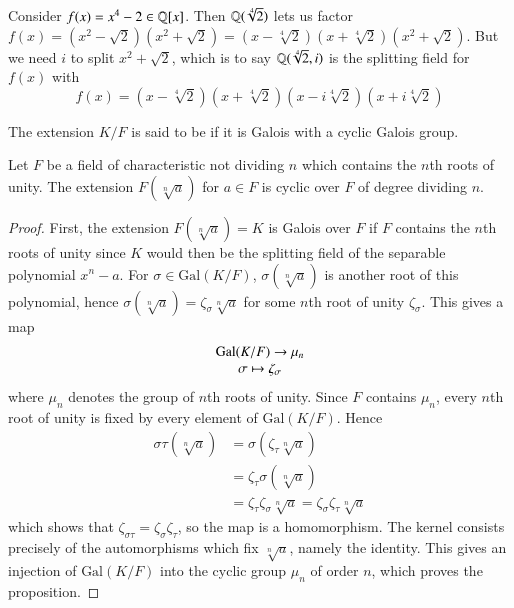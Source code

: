 \documentclass[12pt, a4paper, oneside, openright, titlepage]{book}
\begin{document}
\begin{eg}
    Consider $f(x) = x^4 - 2 \in \mathbb Q[x]$. Then $\mathbb Q(\sqrt[4]{2})$ lets us factor $f(x) = (x^2-\sqrt{2})(x^2+\sqrt{2}) = (x-\sqrt[4]{2})(x+\sqrt[4]{2})(x^2+\sqrt{2})$. But we need $i$ to split $x^2+\sqrt{2}$, which is to say $\mathbb Q(\sqrt[4]{2},i)$ is the splitting field for $f(x)$ with \begin{equation*}
        f(x) = (x-\sqrt[4]{2})(x+\sqrt[4]{2})(x-i\sqrt[4]{2})(x+i\sqrt[4]{2})
    \end{equation*}
\end{eg}

\begin{defn}
    The extension $K/F$ is said to be  if it is Galois with a cyclic Galois group.
\end{defn}


\begin{prop}
    Let $F$ be a field of characteristic not dividing $n$ which contains the $n$th roots of unity. The extension $F(\sqrt[n]{a})$ for $a \in F$ is cyclic over $F$ of degree dividing $n$.
\end{prop}
\begin{proof}
    First, the extension $F(\sqrt[n]{a}) = K$ is Galois over $F$ if $F$ contains the $n$th roots of unity since $K$ would then be the splitting field of the separable polynomial $x^n - a$. For $\sigma \in \text{Gal}(K/F)$, $\sigma(\sqrt[n]{a})$ is another root of this polynomial, hence $\sigma(\sqrt[n]{a}) = \zeta_{\sigma}\sqrt[n]{a}$ for some $n$th root of unity $\zeta_{\sigma}$. This gives a map \begin{equation*}
        \begin{array}{c} \text{Gal}(K/F)\rightarrow \mu_n \\ \sigma\mapsto \zeta_{\sigma} \end{array}
    \end{equation*}
    where $\mu_n$ denotes the group of $n$th roots of unity. Since $F$ contains $\mu_n$, every $n$th root of unity is fixed by every element of $\text{Gal}(K/F)$. Hence \begin{align*}
        \sigma\tau(\sqrt[n]{a}) &= \sigma(\zeta_{\tau}\sqrt[n]{a}) \\
        &= \zeta_{\tau}\sigma(\sqrt[n]{a}) \\
        &= \zeta_{\tau}\zeta_{\sigma}\sqrt[n]{a} = \zeta_{\sigma}\zeta_{\tau}\sqrt[n]{a}
    \end{align*}
    which shows that $\zeta_{\sigma\tau} = \zeta_{\sigma}\zeta_{\tau}$, so the map is a homomorphism. The kernel consists precisely of the automorphisms which fix $\sqrt[n]{a}$, namely the identity. This gives an injection of $\text{Gal}(K/F)$ into the cyclic group $\mu_n$ of order $n$, which proves the proposition.
\end{proof}
\end{document}
